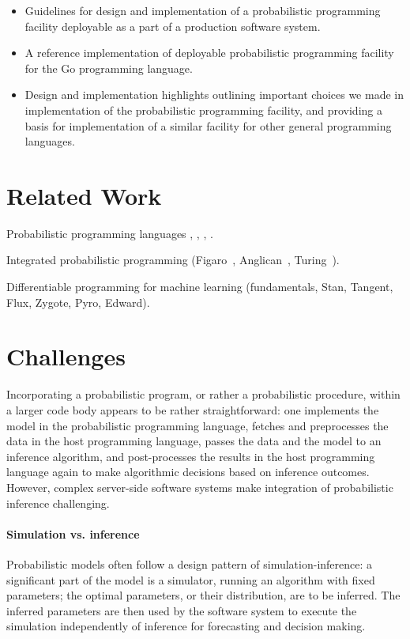 \documentclass[sigplan,review,10pt,anonymous]{acmart}
\begin{document}
\begin{sloppypar}
	\begin{itemize}
		\item Guidelines for design and implementation of a
			probabilistic programming facility deployable as a part 
			of a production software system.
		\item A reference implementation of deployable probabilistic
			programming facility for the Go programming language.
		\item Design and implementation highlights outlining
			important choices we made in implementation of the
			probabilistic programming facility, and providing a
			basis for implementation of a similar facility for
			other general programming languages.
	\end{itemize}

\section{Related Work}
Probabilistic programming languages \cite{GS15}, \cite{MPY+18},
\cite{Stan17}, \cite{GGS19}.

Integrated probabilistic programming (Figaro~\cite{P09},
Anglican~\cite{TMY+16}, Turing~\cite{GXG18}).

Differentiable programming for machine learning (fundamentals,
Stan, Tangent, Flux, Zygote, Pyro, Edward).

\section{Challenges}

Incorporating a probabilistic program, or rather a probabilistic
procedure, within a larger code body appears to be rather
straightforward: one implements the model in the probabilistic
programming language, fetches and preprocesses the data in the
host programming language, passes the data and the model to an
inference algorithm, and post-processes the results in the
host programming language again to make algorithmic
decisions based on inference outcomes. However, complex
server-side software systems make integration of probabilistic
inference challenging. 

\paragraph{Simulation vs. inference} Probabilistic models
often follow a design pattern of simulation-inference: a
significant part of the model is a simulator, running an
algorithm with fixed parameters; the optimal parameters, or
their distribution, are to be inferred. The inferred parameters
are then used by the software system to execute the simulation
independently of inference for forecasting and decision making.


\end{sloppypar}
\end{document}
